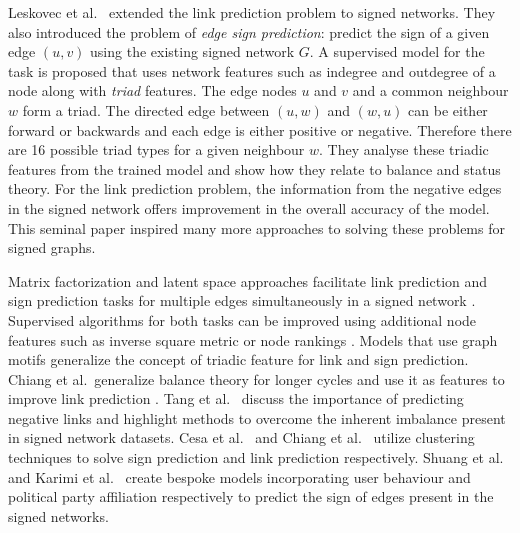 Leskovec et al.\ \cite{leskovec2010predicting} extended the link prediction problem to signed networks. They also introduced the problem of \textit{edge sign prediction}: predict the sign of a given edge $(u,v)$ using the existing signed network $G$. A supervised model for the task is proposed that uses network features such as indegree and outdegree of a node along with \textit{triad} features. The edge nodes $u$ and $v$ and a common neighbour $w$ form a triad. The directed edge between $(u,w)$ and $(w,u)$ can be either forward or backwards and each edge is either positive or negative. Therefore there are 16 possible triad types for a given neighbour $w$. They analyse these triadic features from the trained model and show how they relate to balance and status theory. For the link prediction problem, the information from the negative edges in the signed network offers improvement in the overall accuracy of the model. This seminal paper inspired many more approaches to solving these problems for signed graphs.   

Matrix factorization and latent space approaches facilitate link prediction and sign prediction tasks for multiple edges simultaneously in a signed network \cite{agrawal2013link,hsieh2012low,gu2019link}. Supervised algorithms for both tasks can be improved using additional node features such as inverse square metric \cite{ahmadalinezhad2018sign} or node rankings \cite{shahriari2014ranking}. Models that use graph motifs \cite{Liu2019LinkPrediction,khodadadi2017sign} generalize the concept of triadic feature for link and sign prediction. Chiang et al.\ generalize balance theory for longer cycles and use it as features to improve link prediction \cite{chiang2011exploiting}. Tang et al.\ \cite{Jiliang2015Negative} discuss the importance of predicting negative links and highlight methods to overcome the inherent imbalance present in signed network datasets. Cesa et al.\ \cite{cesa2012correlation} and Chiang et al.\ \cite{chiang2014prediction} utilize clustering techniques to solve sign prediction and link prediction respectively. Shuang et al.\ \cite{Shuang-Hong2012Friend}  and Karimi et al.\ \cite{karimi2019multicongress} create bespoke models incorporating user behaviour and political party affiliation respectively to predict the sign of edges present in the signed networks.


